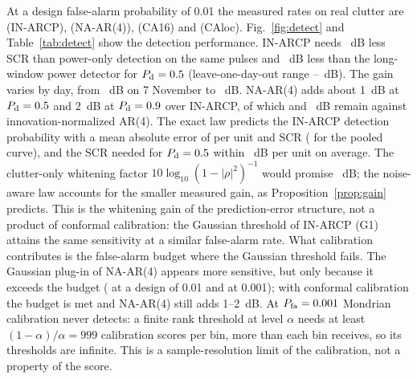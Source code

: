 \documentclass[journal]{IEEEtran}
\begin{document}
At a design false-alarm probability of 0.01 the measured rates on real clutter are \DetPfaINOne{} (IN-ARCP), \DetPfaNAFour{} (NA-AR(4)), \DetPfaCASixteen{} (CA16) and \DetPfaCAloc{} (CAloc). Fig.~\ref{fig:detect} and Table~\ref{tab:detect} show the detection performance. IN-ARCP needs \DetINGainCAHalf~dB less SCR than power-only detection on the same pulses and \DetINGainLocHalf~dB less than the long-window power detector for $P_{\rm d}=0.5$ (leave-one-day-out range \LodoLocLo--\LodoLocHi~dB). The gain varies by day, from \DayGainMin~dB on 7 November to \DayGainMax~dB. NA-AR(4) adds about 1~dB at $P_{\rm d}=0.5$ and 2~dB at $P_{\rm d}=0.9$ over IN-ARCP, of which \NAvsINFourHalf{} and \NAvsINFourNinety~dB remain against innovation-normalized AR(4). The exact law predicts the IN-ARCP detection probability with a mean absolute error of \DetMae{} per unit and SCR (\DetMaePooled{} for the pooled curve), and the SCR needed for $P_{\rm d}=0.5$ within \DetScrErrAbs~dB per unit on average. The clutter-only whitening factor $10\log_{10}(1-|\rho|^2)^{-1}$ would promise \DetNaiveGain~dB; the noise-aware law accounts for the smaller measured gain, as Proposition~\ref{prop:gain} predicts. This is the whitening gain of the prediction-error structure, not a product of conformal calibration: the Gaussian threshold of IN-ARCP (G1) attains the same sensitivity at a similar false-alarm rate. What calibration contributes is the false-alarm budget where the Gaussian threshold fails. The Gaussian plug-in of NA-AR(4) appears more sensitive, but only because it exceeds the budget (\DetPfaNAFourG{} at a design of 0.01 and \DetPfaNAFourGmilli{} at 0.001); with conformal calibration the budget is met and NA-AR(4) still adds 1--2~dB. At $P_{\rm fa}=0.001$ Mondrian calibration never detects: a finite rank threshold at level $\alpha$ needs at least $(1-\alpha)/\alpha=999$ calibration scores per bin, more than each bin receives, so its thresholds are infinite. This is a sample-resolution limit of the calibration, not a property of the score.
\end{document}
